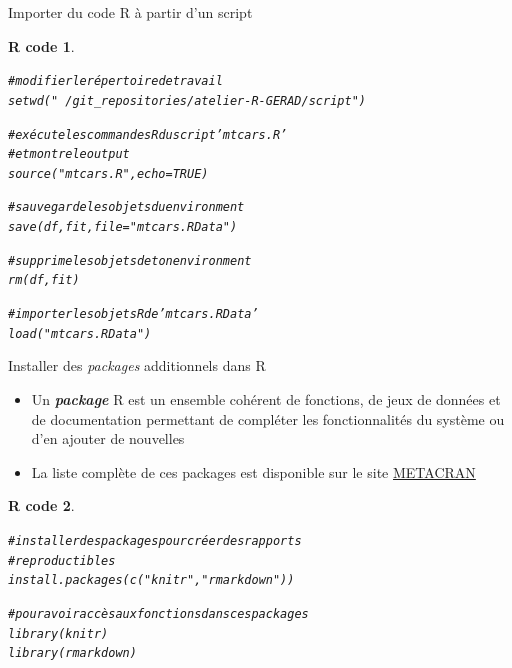 \documentclass[11pt]{beamer}\usepackage[]{graphicx}\usepackage[]{color}
\makeatletter
\newcommand{\hlnum}[1]{\textcolor[rgb]{0.063,0.58,0.627}{#1}}%
\newcommand{\hlstr}[1]{\textcolor[rgb]{0.063,0.58,0.627}{#1}}%
\newcommand{\hlcom}[1]{\textcolor[rgb]{0.588,0.588,0.588}{#1}}%
\newcommand{\hlstd}[1]{\textcolor[rgb]{0.196,0.196,0.196}{#1}}%
\newcommand{\hlkwc}[1]{\textcolor[rgb]{0,0.631,0.314}{#1}}%
\newcommand{\hlkwd}[1]{\textcolor[rgb]{0.78,0.227,0.412}{#1}}%
\newenvironment{kframe}{%
 \def\at@end@of@kframe{}%
 \ifinner\ifhmode%
  \def\at@end@of@kframe{\end{minipage}}%
  \begin{minipage}{\columnwidth}%
 \fi\fi%
 \def\FrameCommand##1{\hskip\@totalleftmargin \hskip-\fboxsep
 \colorbox{shadecolor}{##1}\hskip-\fboxsep
     \hskip-\linewidth \hskip-\@totalleftmargin \hskip\columnwidth}%
 \MakeFramed {\advance\hsize-\width
   \@totalleftmargin\z@ \linewidth\hsize
   \@setminipage}}%
 {\par\unskip\endMakeFramed%
 \at@end@of@kframe}
\newenvironment{knitrout}{}{} %
\newtheorem{rcode}{R code}[section]
\makeatother
\begin{document}
\begin{frame}[fragile]{Importer du code R à partir d'un script}

\begin{knitrout}\small
{}\color{fgcolor}\begin{kframe}
\begin{rcode}\label{unnamed-chunk-29}\begin{alltt}
\hlcom{# modifier le répertoire de travail}
\hlkwd{setwd}\hlstd{(}\hlstr{"~/git_repositories/atelier-R-GERAD/script"}\hlstd{)}

\hlcom{# exécute les commandes R du script 'mtcars.R'}
\hlcom{# et montre le output}
\hlkwd{source}\hlstd{(}\hlstr{"mtcars.R"}\hlstd{,} \hlkwc{echo} \hlstd{=} \hlnum{TRUE}\hlstd{)}

\hlcom{# sauvegarde les objets du environment}
\hlkwd{save}\hlstd{(df, fit,} \hlkwc{file} \hlstd{=} \hlstr{"mtcars.RData"}\hlstd{)}

\hlcom{# supprime les objets de ton environment}
\hlkwd{rm}\hlstd{(df, fit)}

\hlcom{# importer les objets R de 'mtcars.RData'}
\hlkwd{load}\hlstd{(}\hlstr{"mtcars.RData"}\hlstd{)}
\end{alltt}
\end{rcode}\end{kframe}
\end{knitrout}
\end{frame}




\begin{frame}[fragile]{Installer des \textit{packages} additionnels dans R}

\begin{itemize}
  \setlength\itemsep{1em}
\item Un \textit{\textbf{package}} R est un ensemble cohérent de fonctions, de jeux de données et de documentation permettant de compléter les fonctionnalités du
système ou d'en ajouter de nouvelles
\item La liste complète de ces packages est disponible sur le site \href{http://www.r-pkg.org/}{METACRAN}
\end{itemize}
\pause
\begin{knitrout}
\color{fgcolor}\begin{kframe}
\begin{rcode}\label{unnamed-chunk-30}\begin{alltt}
\hlcom{# installer des packages pour créer des rapports}
\hlcom{# reproductibles}
\hlkwd{install.packages}\hlstd{(}\hlkwd{c}\hlstd{(}\hlstr{"knitr"}\hlstd{,}\hlstr{"rmarkdown"}\hlstd{))}

\hlcom{# pour avoir accès aux fonctions dans ces packages}
\hlkwd{library}\hlstd{(knitr)}
\hlkwd{library}\hlstd{(rmarkdown)}
\end{alltt}
\end{rcode}\end{kframe}
\end{knitrout}
\end{frame}
\end{document}
